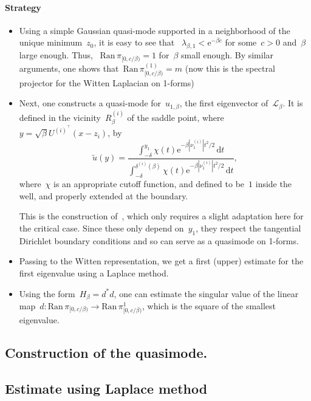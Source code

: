 \documentclass[10pt]{article}
\newcommand{\cL}{\mathcal{L}}
\renewcommand{\d}{\mathrm{d}}
\newcommand{\e}{\mathrm{e}}
\newcommand{\1}{\mathbbm 1}
\newcommand{\deltai}{\delta^{(i)}}
\begin{document}
        \paragraph{Strategy}
        \begin{itemize}
            \item{Using a simple Gaussian quasi-mode supported in a neighborhood of the unique minimum~$z_0$, it is easy to see that 
           ~$\lambda_{\beta,1} < \e^{-\beta c}$ for some~$c>0$ and~$\beta$ large enough.
            Thus,
           ~$\mathrm{Ran}\,\pi_{[0,c/\beta)}=1$ for~$\beta$ small enough. By similar arguments, one shows that~$\mathrm{Ran}\,\pi^{(1)}_{[0,c/\beta)}= m$ (now this is the spectral projector for the Witten Laplacian on 1-forms)} 
            \item{
                Next, one constructs a quasi-mode for~$u_{1,\beta}$, the first eigenvector of~$\cL_\beta$. It is defined in the vicinity~$R_\beta^(i)$ of the saddle point,
                where~$y = \sqrt{\beta}{U^{(i)^\intercal}}(x-z_i)$, by
               ~$$\widetilde{u}(y) = \frac{\int_{-\delta}^{y_1}\chi(t)\e^{-\beta|\nu_1^{(i)}|t^2/2}\,\d t}{\int_{-\delta}^{\deltai(\beta) }\chi(t)\e^{-\beta|\nu_1^{(i)}|t^2/2}\,\d t},$$
                where~$\chi$ is an appropriate cutoff function, and defined to be~$1$ inside the well, and properly extended at the boundary.

                This is the construction of~\cite{LPN21}, which only requires a slight adaptation here for the critical case.
                Since these only depend on~$y_1$, they respect the tangential Dirichlet boundary conditions and so can serve as a quasimode on 1-forms.
            }
            \item{
                Passing to the Witten representation, we get a first (upper) estimate for the first eigenvalue using a Laplace method.
            }
            \item{Using the form~$H_\beta = d^*d$, one can estimate the singular value of the linear map~$d : \mathrm{Ran}\,\pi_{[0,c/\beta)}\to \mathrm{Ran}\,\pi^{1}_{[0,c/\beta)}$}, which is the square of the smallest eigenvalue. 
        \end{itemize}

        \subsection{Construction of the quasimode.}

        \subsection{Estimate using Laplace method}
\end{document}
